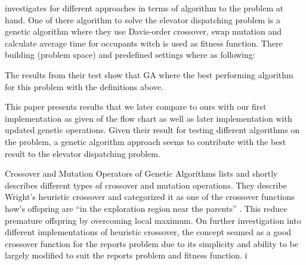 \cite{ahmed2022investigation} investigates for different approaches in terms of algorithm to the problem at hand.  One of there algorithm to solve the elevator dispatching problem is a genetic algorithm where they use Davis-order crossover, swap mutation and calculate average time for occupants  witch is used as fitness function. There building (problem space) and predefined settings where as following:

The results from their test show that GA where the best performing algorithm for this problem with the definitions above.

This paper presents results that we later compare to ours with our first implementation as given of the flow chart\cite{tartan2016genetic} as well as later implementation with updated genetic operations. Given their result for testing different algorithms on the problem, a genetic algorithm approach seems to contribute with the best result to the elevator dispatching problem.

Crossover and Mutation Operators of Genetic Algorithms \cite{lim2017crossover} lists and shortly describes different types of crossover and mutation operations. They describe Wright's heuristic crossover and categorized it as one of the crossover functions how’s offspring are “in the exploration region near the parents” \cite{lim2017crossover} . This reduce premature offspring by overcoming local maximum. On further investigation into different implementations of heuristic crossover, the concept seamed as a good crossover function for the reports problem due to its simplicity and ability to be largely modified to suit the reports problem and fitness function.
i


